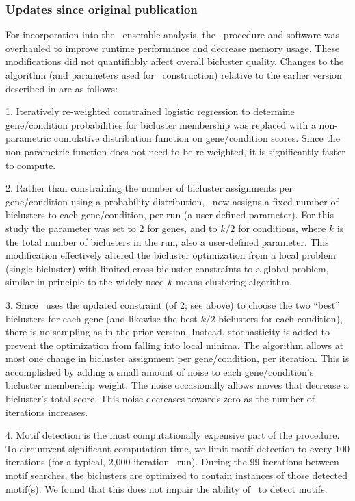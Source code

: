 \subsubsection{Updates since original publication}

For incorporation into the \egrine~ensemble analysis, the \cm\
procedure and software was overhauled to improve runtime performance
and decrease memory usage. These modifications did not quantifiably
affect overall bicluster quality. Changes to the algorithm (and
parameters used for \egrine~construction) relative to the earlier
version described in \cite{Reiss2006n} are as follows:

1. Iteratively re-weighted constrained logistic regression
to determine gene/condition probabilities for bicluster membership was
replaced with a non-parametric cumulative distribution function on
gene/condition scores. Since the non-parametric function does not need
to be re-weighted, it is significantly faster to compute.

2. Rather than constraining the number of bicluster assignments per
gene/condition using a probability distribution, \cm\ now assigns a
fixed number of biclusters to each gene/condition, per run (a
user-defined parameter). For this study the parameter was set to 2 for
genes, and to $k/2$ for conditions, where $k$ is the total number of
biclusters in the run, also a user-defined parameter. This
modification effectively altered the bicluster optimization from a
local problem (single bicluster) with limited cross-bicluster
constraints to a global problem, similar in principle to the widely
used $k$-means clustering algorithm.

3. Since \cm\ uses the updated constraint (of 2; see above) to choose
the two ``best'' biclusters for each gene (and likewise the best $k/2$
biclusters for each condition), there is no sampling as in the prior
version. Instead, stochasticity is added to prevent the optimization
from falling into local minima. The algorithm allows at most one
change in bicluster assignment per gene/condition, per iteration. This
is accomplished by adding a small amount of noise to each
gene/condition's bicluster membership weight. The noise occasionally
allows moves that decrease a bicluster's total score. This noise
decreases towards zero as the number of iterations increases.

4. Motif detection is the most computationally expensive part of the
procedure. To circumvent significant computation time, we limit motif 
detection to every 100 iterations (for a typical,
2,000 iteration \cm\ run). During the 99 iterations between motif
searches, the biclusters are optimized to contain instances of those
detected motif(s). We found that this does not impair the ability of
\cm\ to detect motifs.

